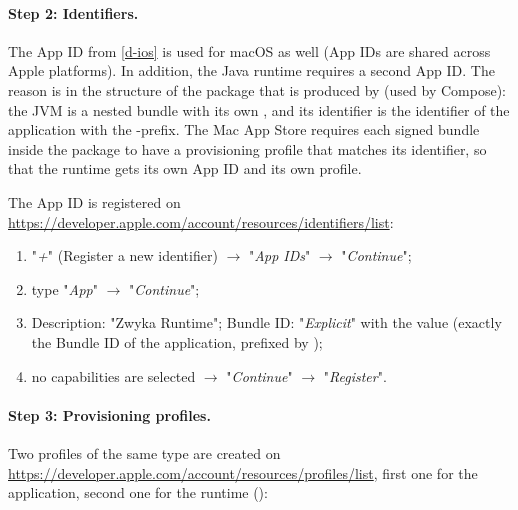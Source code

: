 \paragraph{Step 2: Identifiers.} The App ID  from \ref{d-ios} is used for macOS as well (App IDs are
shared across Apple platforms). In addition, the Java runtime requires a second App ID. The reason is in the structure
of the package that is produced by  (used by Compose): the JVM is a nested bundle
 with its own , and its identifier is the identifier of the application with
the -prefix. The Mac App Store requires each signed bundle inside the package to have a provisioning
profile that matches its identifier, so that the runtime gets its own App ID and its own profile.

\noindent The App ID is registered on
\href{https://developer.apple.com/account/resources/identifiers/list}{https://developer.apple.com/account/resources/identifiers/list}:

\begin{enumerate}
  \item "\emph{+}" (Register a new identifier) $\rightarrow$ "\emph{App IDs}" $\rightarrow$ "\emph{Continue}";
  \item type "\emph{App}" $\rightarrow$ "\emph{Continue}";
  \item Description: "Zwyka Runtime"; Bundle ID: "\emph{Explicit}" with the value
   (exactly the Bundle ID of the application, prefixed by );
  \item no capabilities are selected $\rightarrow$ "\emph{Continue}" $\rightarrow$ "\emph{Register}".
\end{enumerate}

\paragraph{Step 3: Provisioning profiles.} Two profiles of the same type are created on
\href{https://developer.apple.com/account/resources/profiles/list}{https://developer.apple.com/account/resources/profiles/list},
first one for the application, second one for the runtime ():

